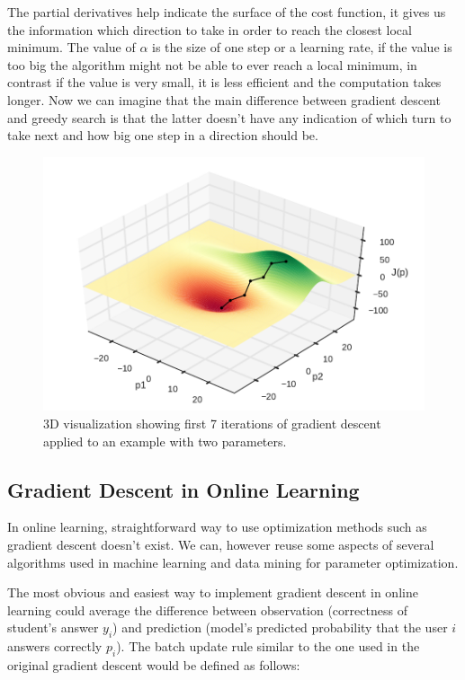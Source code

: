 The partial derivatives help indicate the surface of the cost function, it gives us the information which direction to take in order to reach the closest local minimum. The value of $\alpha$ is the size of one step or a learning rate, if the value is too big the algorithm might not be able to ever reach a local minimum, in contrast if the value is very small, it is less efficient and the computation takes longer. Now we can imagine that the main difference between gradient descent and greedy search is that the latter doesn't have any indication of which turn to take next and how big one step in a direction should be.

\begin{figure}[htbp]
  \centering
  \includegraphics[width=\textwidth]{img/gradient-descent}
  \caption{3D visualization showing first 7 iterations of gradient descent applied to an example with two parameters.}
  \label{fig-gradient-descent}
\end{figure}

\subsection*{Gradient Descent in Online Learning}

In online learning, straightforward way to use optimization methods such as gradient descent doesn't exist. We can, however reuse some aspects of several algorithms used in machine learning and data mining for parameter optimization.

The most obvious and easiest way to implement gradient descent in online learning could average the difference between observation (correctness of student's answer $y_i$) and prediction (model's predicted probability that the user $i$ answers correctly $p_i$). The batch update rule similar to the one used in the original gradient descent would be defined as follows:

